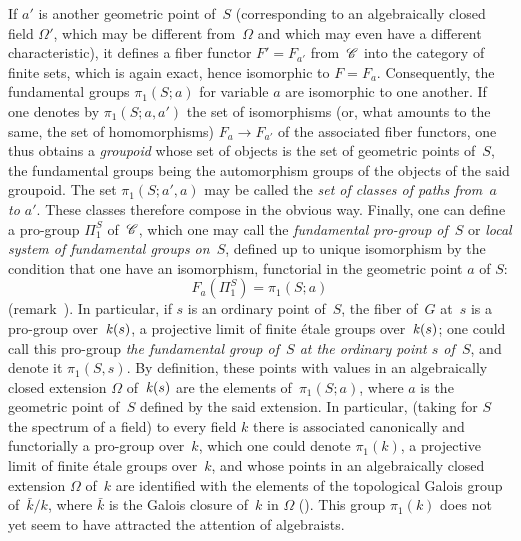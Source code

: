If $a'$ is another geometric point of~$S$ (corresponding
to an algebraically closed field $\Omega'$, which may be
different from~$\Omega$ and which may even have a
different characteristic), it defines a fiber functor
$F'=F_{a'}$ from~$\cal{C}$ into the category of finite sets,
which is again exact, hence isomorphic to $F=F_a$. Consequently, the
fundamental groups $\pi_1(S;a)$
for variable $a$ are isomorphic to one another. If one denotes by
$\pi_1(S;a,a')$
the set of isomorphisms (or, what amounts to the same,
the set of homomorphisms) $F_a\to F_{a'}$ of the associated fiber functors,
one thus obtains a \emph{groupoid} whose
set of objects is the set of geometric points
of~$S$, the fundamental groups being the automorphism
groups of the objects of the said groupoid. The set
$\pi_1(S;a',a)$ may be called the \emph{set of classes
of paths from~$a$ to $a'$}. These classes therefore compose in the obvious way. Finally, one can define a pro-group $\Pi_1^S$
of~$\cal{C}$, which one may call the \emph{fundamental pro-group
of}~$S$
or \emph{local system of fundamental groups on}~$S$,
defined up to unique isomorphism by the condition that one
have an isomorphism, functorial in the geometric point $a$ of
$S$:
$$
F_a(\Pi_1^S)=\pi_1(S;a)
$$
(\cf remark~). In particular, if $s$ is an ordinary
point of~$S$, the fiber of~$G$ at~$s$ is a pro-group over~$\mathit{k}(s)$,
a projective limit of finite \'etale groups over~$\mathit{k}(s)$; one could
call this pro-group \emph{the fundamental group of~$S$ at the
ordinary point $s$ of~$S$}, and denote it $\pi_1(S,s)$. By definition, these
points with values in an algebraically closed extension
$\Omega$ of~$\mathit{k}(s)$ are the elements of~$\pi_1(S;a)$, where
$a$ is the geometric point of~$S$ defined by the said
extension. In particular, (taking for $S$ the spectrum of a field)
to every field $k$ there is associated canonically and functorially
a pro-group over~$k$, which one could denote $\pi_1(k)$, a
projective limit of finite \'etale groups over~$k$, and whose points
in an algebraically closed extension $\Omega$ of~$k$
are identified
with the elements of the topological Galois group of~$\bar{k}/k$,
where $\bar{k}$ is the Galois closure of~$k$ in $\Omega$
(\cf {}). This group $\pi_1(k)$ does not yet seem to have
attracted the attention of algebraists.

